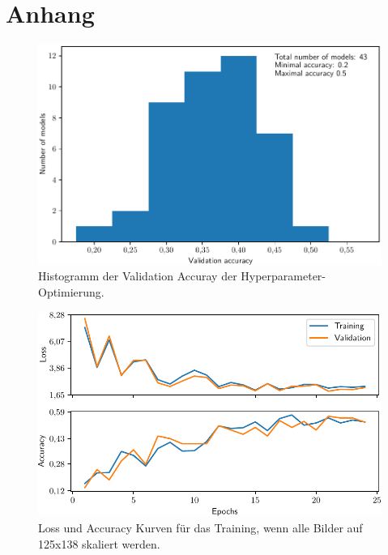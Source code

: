 \section{Anhang}
\begin{figure}
  \centering
  \includegraphics[width=\textwidth]{pics/ergebnisse/acc_hist.pdf}
  \caption{Histogramm der Validation Accuray der Hyperparameter-Optimierung.}
  \label{fig:acc-hist}
\end{figure}

\begin{figure}
  \centering
  \includegraphics[width=\textwidth]{pics/ergebnisse/history_epoch_kleine_groesse.pdf}
  \caption{Loss und Accuracy Kurven für das Training, wenn alle Bilder
  auf 125x138 skaliert werden.}
  \label{fig:loss-acc-kleine-größen}
\end{figure}



